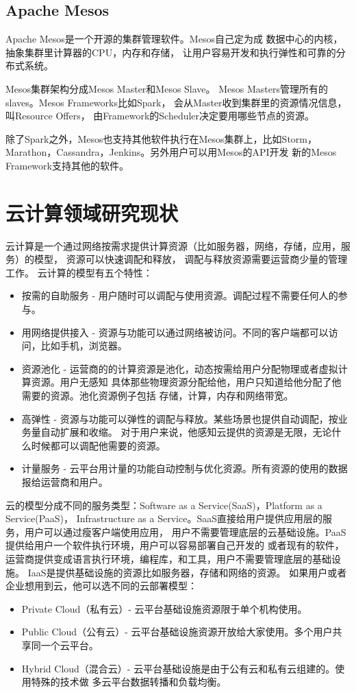 \subsection{Apache Mesos}
Apache Mesos是一个开源的集群管理软件。Mesos自己定为成
数据中心的内核，抽象集群里计算器的CPU，内存和存储，
让用户容易开发和执行弹性和可靠的分布式系统。

Mesos集群架构分成Mesos Master和Mesos Slave。
Mesos Masters管理所有的slaves。Mesos Frameworks比如Spark，
会从Master收到集群里的资源情况信息，叫Resource Offers，
由Framework的Scheduler决定要用哪些节点的资源。

除了Spark之外，Mesos也支持其他软件执行在Mesos集群上，比如Storm，
Marathon，Cassandra，Jenkins。另外用户可以用Mesos的API开发
新的Mesos Framework支持其他的软件。



\section{云计算领域研究现状}
\label{subsec:cloud_background}
云计算是一个通过网络按需求提供计算资源（比如服务器，网络，存储，应用，服务）的模型，
资源可以快速调配和释放，
调配与释放资源需要运营商少量的管理工作。\cite{mell2011nist}
云计算的模型有五个特性：
\begin{itemize}
  \item 按需的自助服务 - 
        用户随时可以调配与使用资源。调配过程不需要任何人的参与。
  \item 用网络提供接入 - 
        资源与功能可以通过网络被访问。不同的客户端都可以访问，比如手机，浏览器。
  \item 资源池化 - 
        运营商的的计算资源是池化，动态按需给用户分配物理或者虚拟计算资源。用户无感知
        具体那些物理资源分配给他，用户只知道给他分配了他需要的资源。池化资源例子包括
        存储，计算，内存和网络带宽。
  \item 高弹性 - 
        资源与功能可以弹性的调配与释放。某些场景也提供自动调配，按业务量自动扩展和收缩。
        对于用户来说，他感知云提供的资源是无限，无论什么时候都可以调配他需要的资源。
  \item 计量服务 - 
        云平台用计量的功能自动控制与优化资源。所有资源的使用的数据报给运营商和用户。
\end{itemize}
云的模型分成不同的服务类型：Software as a Service(SaaS)，Platform as a Service(PaaS)，
Infrastructure as a Service。SaaS直接给用户提供应用层的服务，用户可以通过瘦客户端使用应用，
用户不需要管理底层的云基础设施。PaaS提供给用户一个软件执行环境，用户可以容易部署自己开发的
或者现有的软件，运营商提供变成语言执行环境，编程库，和工具，用户不需要管理底层的基础设施。
IaaS是提供基础设施的资源比如服务器，存储和网络的资源。
如果用户或者企业想用到云，他可以选不同的云部署模型：
\begin{itemize}
  \item Private Cloud（私有云）- 
        云平台基础设施资源限于单个机构使用。
  \item Public Cloud（公有云）- 
        云平台基础设施资源开放给大家使用。多个用户共享同一个云平台。
  \item Hybrid Cloud（混合云）-
        云平台基础设施是由于公有云和私有云组建的。使用特殊的技术做
        多云平台数据转播和负载均衡。
\end{itemize}

